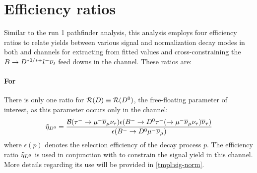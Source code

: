 \section{Efficiency ratios}
\label{ref:fit:eff}

Similar to the run 1 \RDX pathfinder analysis,
this analysis employs four efficiency ratios to relate yields between
various signal and normalization decay modes in both \Dz and \Dstar channels
for extracting \RDX from fitted values and cross-constraining the
$B \rightarrow D^{*0/*+}{l^-}{{\overline{\nu}}_l}$ feed downs in the \Dz channel.
These ratios are:

\paragraph{For \RD}
There is only one ratio for $\mathcal{R}(D) \equiv \mathcal{R}({{D}^0})$,
the free-floating parameter of interest,
as this parameter occurs only in the \Dz channel:
\begin{equation}
    \tilde{\eta}_{\Dz} = \frac{
        \mathcal{B}(\taum \rightarrow \mun\neumb\neut)
        \epsilon{(\Bm \rightarrow \Dz \taum (\rightarrow \mun\neumb\neut) \neutb)}
    }{
        \epsilon({\Bm \rightarrow \Dz \mun \neumb})
    }
\end{equation}
where $\epsilon(p)$ denotes the selection efficiency of the decay process $p$.
The efficiency ratio
$\tilde{\eta}_{{{D}^0}}$ is used in conjunction with \RD to constrain the signal
yield in this channel.
More details regarding its use will be provided in \cref{tmpl:sig-norm}.
